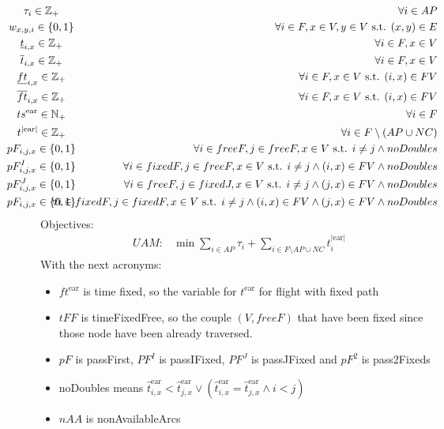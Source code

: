 \documentclass[../thesis.tex]{subfiles}
\begin{document}
{\begin{align}
&\mathclap{\tau_i\in \mathbb{Z}_+} &\forall i\in AP\nonumber\\
%
%
%
&\mathclap{w_{x,y,i}\in \{0,1\}} &\forall i\in F,x\in V,y\in V\text{ s.t. } (x,y)\in E \nonumber\\
&\mathclap{\underline t_{i,x}\in \mathbb{Z}_+} &\forall i\in F,x\in V \nonumber\\
&\mathclap{\overline  t_{i,x}\in \mathbb{Z}_+} &\forall i\in F,x\in V \nonumber\\
&\mathclap{\underline {ft}_{i,x}\in \mathbb{Z}_+} &\forall i\in F,x\in V \text{ s.t. } (i,x)\in FV\nonumber\\
&\mathclap{\overline  {ft}_{i,x}\in \mathbb{Z}_+} &\forall i\in F,x\in V \text{ s.t. } (i,x)\in FV\nonumber\\
&\mathclap{ts^\text{ear}\in \mathbb{N}_+} &\forall i\in F\nonumber \\
&\mathclap{t^\text{|ear|}\in \mathbb{Z}_+} &\forall i\in F\setminus(AP\cup NC)\nonumber \\
&\mathclap{pF_{i,j,x}\in \{0,1\}} &\forall i\in freeF,j\in freeF,x\in V\text{ s.t. } i\neq j\land noDoubles\nonumber\\
&\mathclap{pF^I_{i,j,x}\in \{0,1\}} &\forall i\in fixedF,j\in freeF,x\in V\text{ s.t. } i\neq j \land (i,x)\in FV \land noDoubles \nonumber\\
&\mathclap{pF^J_{i,j,x}\in \{0,1\}} &\forall i\in freeF,j\in fixedJ,x\in V\text{ s.t. } i\neq j \land (j,x)\in FV \land noDoubles \nonumber\\
&\mathclap{pF_{i,j,x}\in \{0,1\}} &\forall i\in fixedF,j\in fixedF,x\in V\text{ s.t. } i\neq j\land (i,x)\in FV\land (j,x)\in FV \land noDoubles\nonumber
\end{align}
Objectives:
\begin{align}
    UAM:&\min \sum_{i\in AP} \tau_i + \sum_{i\in F\setminus{AP\cup NC}} t^\text{|ear|}_i
\end{align}
}
With the next acronyms:
\begin{itemize}
    \item $ft^\text{ear}$ is time fixed, so the variable for $t^\text{ear}$ for flight with fixed path
    \item $tFF$ is timeFixedFree, so the couple $(V,freeF)$ that have been fixed since those node have been already traversed.
    \item $pF$ is passFirst, $PF^I$ is passIFixed, $PF^J$ is passJFixed and $pF^2$ is pass2Fixeds
    \item noDoubles means $\hat t^\text{ear}_{i,x} <\hat t^\text{ear}_{j,x} \lor (\hat t^\text{ear}_{i,x} = \hat t^\text{ear}_{j,x}\land i<j)$
    \item $nAA$ is nonAvailableArcs
\end{itemize}
\end{document}
